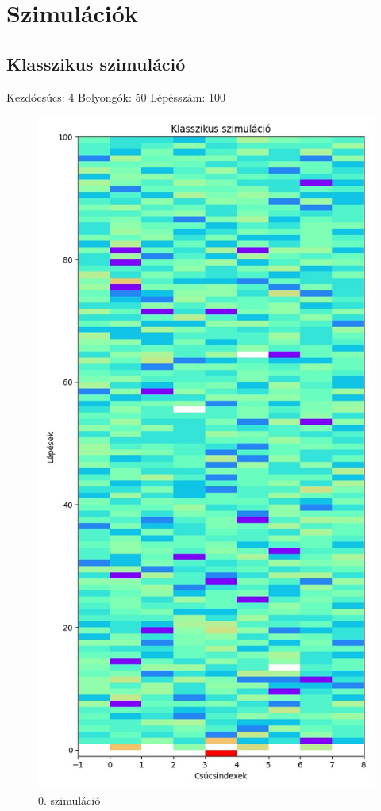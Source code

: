 \documentclass[14pt,a4paper]{article}
\begin{document}
\section{Szimulációk}
\subsection{Klasszikus szimuláció}
Kezdőcsúcs: 4
Bolyongók: 50
Lépésszám: 100
\begin{figure}[H]
\centering
\includegraphics[width = 0.7\columnwidth]{sim_00/counts.jpg}
\caption{0. szimuláció}
\end{figure}
\end{document}
